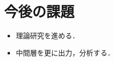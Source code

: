 \documentclass[a4paper,10pt]{jsarticle}
\begin{document}


\section{今後の課題}
\begin{itemize}
 \item 理論研究を進める．
 \item 中間層を更に出力，分析する．
\end{itemize}
\end{document}
